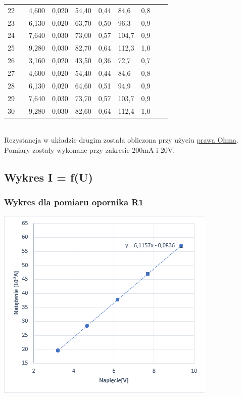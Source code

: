 \documentclass[12pt]{article}
\begin{document}
\begin{adjustbox}{center}
\begin{tabular}{|p{0.5cm}|p{1.5cm}|p{1cm}|p{1.5cm}|p{1.5cm}|p{2cm}|p{1.3cm}|p{1.2cm}|p{1.5cm}|p{1.5cm}|}
    22 && 4,600 & 0,020 & 54,40 & 0,44 & 84,6& 0,8  && \\
    23 && 6,130 & 0,020 & 63,70 & 0,50 & 96,3& 0,9  && \\
    24 && 7,640 & 0,030 & 73,00 & 0,57 & 104,7& 0,9  && \\
    25 && 9,280 & 0,030 & 82,70 & 0,64 & 112,3& 1,0  && \\
    26 && 3,160 & 0,020 & 43,50 & 0,36 & 72,7& 0,7   &&\\
    27 && 4,600 & 0,020 & 54,40 & 0,44 & 84,6& 0,8   &&\\
    28 && 6,130 & 0,020 & 64,60 & 0,51 & 94,9& 0,9  && \\
    29 && 7,640 & 0,030 & 73,70 & 0,57 & 103,7& 0,9  && \\
    30 && 9,280 & 0,030 & 82,60 & 0,64 & 112,4& 1,0 && \\
    \hline
\end{tabular}
\end{adjustbox}\\

Rezystancja w układzie drugim została obliczona przy użyciu \hyperlink{ohm}{prawa Ohma}.
Pomiary zostały wykonane przy zakresie 200mA i 20V.

\subsection{Wykres I = f(U)}

\subsubsection{Wykres dla pomiaru opornika R1}
\includegraphics{pomiar1.png}
\end{document}
